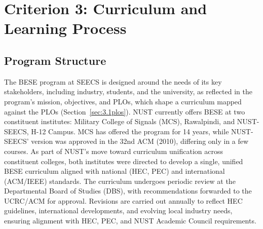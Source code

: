 \hypertarget{criterion3}{%
\chapter{Criterion 3: Curriculum and Learning Process}\label{criterion3}}

\hypertarget{sec:4.1programstructure}{%
\section{Program Structure}\label{sec:4.1programstructure}}
The BESE program at SEECS is designed around the needs of its key stakeholders, including industry, students, and the university, as reflected in the program’s mission, objectives, and PLOs, which shape a curriculum mapped against the PLOs (Section~\ref{sec:3.1plos}). NUST currently offers BESE at two constituent institutes: Military College of Signals (MCS), Rawalpindi, and NUST-SEECS, H-12 Campus. MCS has offered the program for 14 years, while NUST-SEECS' version was approved in the 32nd ACM (2010), differing only in a few courses. As part of NUST's move toward curriculum unification across constituent colleges, both institutes were directed to develop a single, unified BESE curriculum aligned with national (HEC, PEC) and international (ACM/IEEE) standards. The curriculum undergoes periodic review at the Departmental Board of Studies (DBS), with recommendations forwarded to the UCRC/ACM for approval. Revisions are carried out annually to reflect HEC guidelines, international developments, and evolving local industry needs, ensuring alignment with HEC, PEC, and NUST Academic Council requirements.

